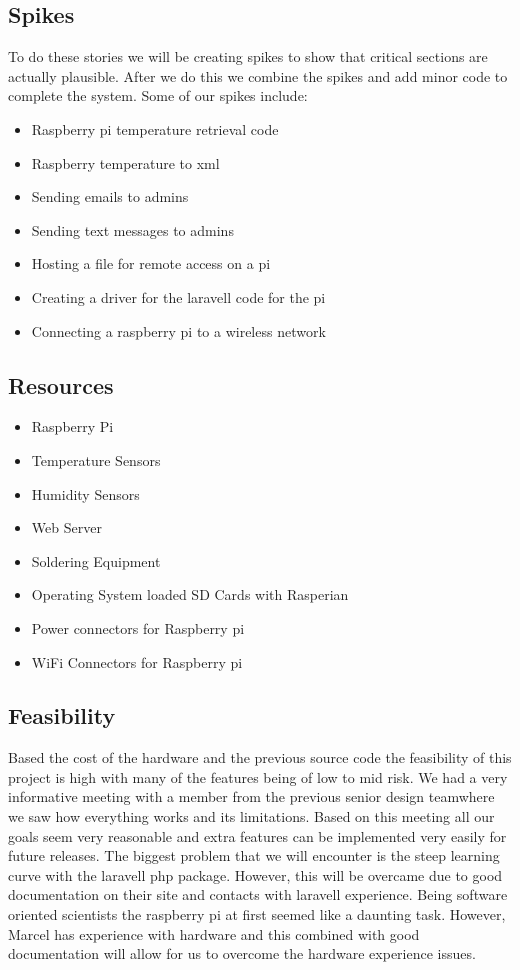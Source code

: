 \documentclass{report}
\begin{document}
\subsection*{Spikes}
To do these stories we will be creating spikes to show that critical sections are actually plausible. 
After we do this we combine the spikes and add minor code to complete the system.
Some of our spikes include:
\begin{itemize} 
\item Raspberry pi temperature retrieval code
\item Raspberry temperature to xml
\item Sending emails to admins
\item Sending text messages to admins
\item Hosting a file for remote access on a pi
\item Creating a driver for the laravell code for the pi 
\item Connecting a raspberry pi to a wireless network
\end{itemize}
\newpage
\subsection*{Resources}
\begin{itemize}
\item Raspberry Pi
\item Temperature Sensors
\item Humidity Sensors
\item Web Server
\item Soldering Equipment
\item Operating System loaded SD Cards with Rasperian
\item Power connectors for Raspberry pi
\item WiFi Connectors for Raspberry pi
\end{itemize}
\newpage
\subsection*{Feasibility}
Based the cost of the hardware and the previous source code the feasibility of this project is high with many of the features being of low to mid risk. 
We had a very informative meeting with a member from the previous senior design teamwhere we saw how everything works and its limitations.
Based on this meeting all our goals seem very reasonable and extra features can be implemented very easily for future releases.
The biggest problem that we will encounter is the steep learning curve with the laravell php package.
However, this will be overcame due to good documentation on their site and contacts with laravell experience.
Being software oriented scientists the raspberry pi at first seemed like a daunting task. 
However, Marcel has experience with hardware and this combined with good documentation will allow for us to overcome the hardware experience issues.
\end{document}
